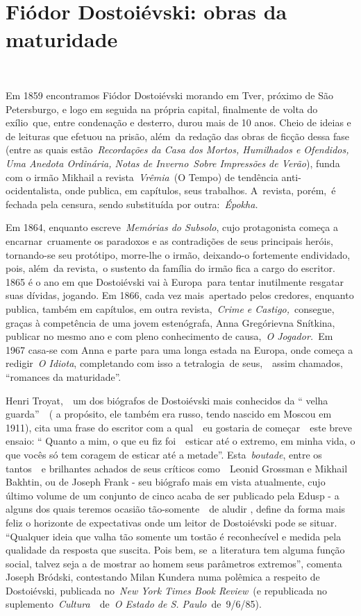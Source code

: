 ~

~

\section{Fiódor Dostoiévski: obras da maturidade}

~

Em 1859 encontramos Fiódor Dostoiévski morando em Tver, próximo de São
Petersburgo, e logo em seguida na própria capital, finalmente de volta
do exílio~que, entre condenação e desterro, durou mais de 10 anos. Cheio
de ideias e de leituras que efetuou na prisão, além~da redação das obras
de ficção dessa fase (entre as quais estão~\emph{Recordações da Casa dos
Mortos, Humilhados e Ofendidos, Uma Anedota Ordinária, Notas de
Inverno}~\emph{Sobre Impressões de Verão}), funda com o irmão Mikhail a
revista~\emph{Vrêmia}~(O Tempo) de tendência anti-ocidentalista, onde
publica, em capítulos, seus trabalhos. A~revista, porém,~é fechada pela
censura, sendo substituída por outra:~\emph{Épokha.}

Em 1864, enquanto escreve~\emph{Memórias do Subsolo}, cujo protagonista
começa a encarnar~cruamente os paradoxos e as contradições de seus
principais heróis, tornando-se seu protótipo, morre-lhe o irmão,
deixando-o fortemente endividado, pois, além~da revista,~o sustento da
família do irmão fica a cargo do escritor. 1865 é o ano em que
Dostoiévski vai à Europa~para tentar inutilmente resgatar suas dívidas,
jogando. Em 1866, cada vez mais~apertado pelos credores, enquanto
publica, também em capítulos, em outra revista,~\emph{Crime e
Castigo,}~consegue, graças à competência de uma jovem estenógrafa, Anna
Gregórievna Snítkina, publicar no mesmo ano e com pleno conhecimento de
causa,~\emph{O Jogador.~}Em 1967 casa-se com Anna e parte para uma longa
estada na Europa, onde começa a redigir~\emph{O Idiota}, completando com
isso a tetralogia~de seus,~~assim chamados, ``romances da maturidade''.

Henri Troyat,~~um dos biógrafos de Dostoiévski mais conhecidos da ``
velha guarda''~~( a propósito, ele também era russo, tendo nascido em
Moscou em 1911), cita uma frase do escritor com a qual~~eu gostaria de
começar~~este breve ensaio: `` Quanto a mim, o que eu fiz foi~~esticar
até o extremo, em minha vida, o que vocês só tem coragem de esticar até
a metade''. Esta~\emph{boutade}, entre os tantos~~e brilhantes achados
de seus críticos como~~Leonid Grossman e Mikhail Bakhtin, ou de Joseph
Frank - seu biógrafo mais em vista atualmente, cujo último volume de um
conjunto de cinco acaba de ser publicado pela Edusp - a alguns dos quais
teremos ocasião tão-somente~~de aludir , define da forma mais feliz o
horizonte de expectativas onde um leitor de Dostoiévski pode se situar.
``Qualquer ideia que valha tão somente um tostão é reconhecível e medida
pela qualidade da resposta que suscita. Pois bem, se~a literatura tem
alguma função social, talvez seja a de mostrar ao homem seus parâmetros
extremos'', comenta Joseph Bródski, contestando Milan Kundera numa
polêmica a respeito de Dostoiévski, publicada no~\emph{New York Times
Book Review}~(e republicada no suplemento~\emph{Cultura~}~de~\emph{O
Estado de S. Paulo}~de~9/6/85).

